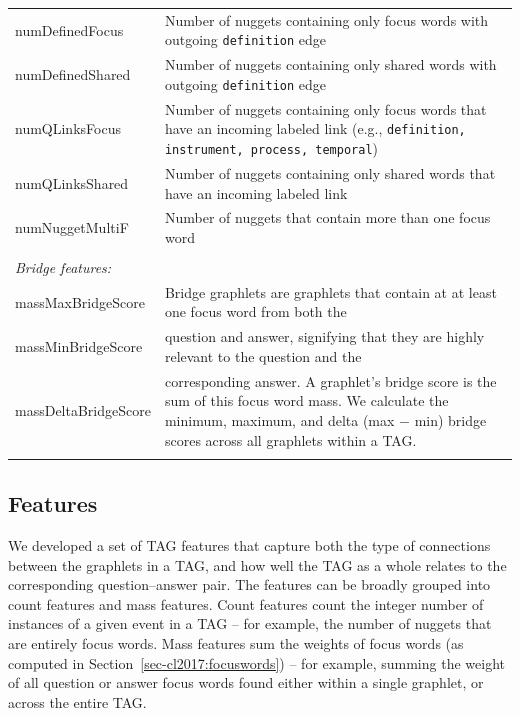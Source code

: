 \begin{table}[]
{\begin{tabular}{p{35mm}p{105mm}}
numDefinedFocus		&	Number of nuggets containing only focus words with outgoing {\tt definition} edge \\
numDefinedShared	&	Number of nuggets containing only shared words with outgoing {\tt definition} edge \\
numQLinksFocus		&	Number of nuggets containing only focus words that have an incoming labeled link (e.g., {\tt definition, instrument, process, temporal})  \\
numQLinksShared		&	Number of nuggets containing only shared words that have an incoming labeled link  \\
numNuggetMultiF		&	Number of nuggets that contain more than one focus word\\
\\
\multicolumn{2}{l}{\emph{Bridge features:}} \\
massMaxBridgeScore		&	Bridge graphlets are graphlets that contain at at least one focus word from both the  \\
massMinBridgeScore		&	question and answer, signifying that they are highly relevant to the question and the \\
massDeltaBridgeScore	&	corresponding answer. A   graphlet's bridge score is the sum of this focus word mass.  We calculate the minimum, maximum, and delta (max $-$ min) bridge scores across all graphlets within a TAG. \\
\\



\hline
\end{tabular}
}
\label{tab:features}
\end{table}


\subsection {Features} 
\label{sec-cl2017:featuresandscoring}

We developed a set of TAG features that capture both the type of connections between the graphlets in a TAG, and how well the TAG as a whole relates to the corresponding question--answer pair.
The features can be broadly grouped into count features and mass features. Count features count the integer number of instances of a given event in a TAG -- for example, the number of nuggets that are entirely focus words.  Mass features sum the weights of focus words (as computed in Section~\ref{sec-cl2017:focuswords}) -- for example, summing the weight of all question or answer focus words found either within a single graphlet, or across the entire TAG.

